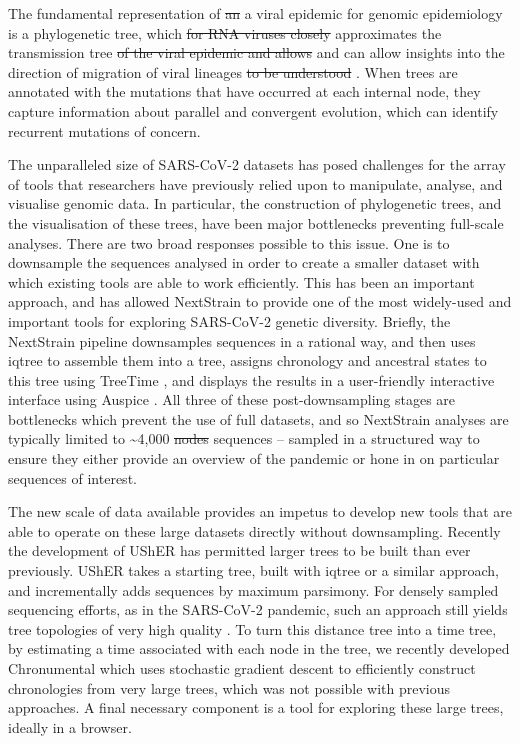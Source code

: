 \documentclass[twocolumn]{bioRxiv}
\providecommand{\DIFadd}[1]{{\protect\color{teal}#1}}
\providecommand{\DIFdel}[1]{{\protect\color{red}\sout{#1}}}
\providecommand{\DIFaddbegin}{}
\providecommand{\DIFaddend}{}
\providecommand{\DIFdelbegin}{}
\providecommand{\DIFdelend}{}
\begin{document}
The fundamental representation of \DIFdelbegin \DIFdel{an }\DIFdelend \DIFaddbegin \DIFadd{a viral }\DIFaddend epidemic for genomic epidemiology is a phylogenetic tree, which \DIFdelbegin \DIFdel{for RNA viruses closely }\DIFdelend approximates the transmission tree \DIFdelbegin \DIFdel{of the viral epidemic and allows }\DIFdelend \DIFaddbegin \DIFadd{and can allow insights into }\DIFaddend the direction of migration of viral lineages \DIFdelbegin \DIFdel{to be understood }\DIFdelend \citep{pmid27501264}. When trees are annotated with the mutations that have occurred at each internal node, they capture information about parallel and convergent evolution, which can identify recurrent mutations of concern.

The unparalleled size of SARS-CoV-2 datasets has posed challenges for the array of tools that researchers have previously relied upon to manipulate, analyse, and visualise genomic data. In particular, the construction of phylogenetic trees, and the visualisation of these trees, have been major bottlenecks preventing full-scale analyses. There are two broad responses possible to this issue. One is to downsample the sequences analysed in order to create a smaller dataset with which existing tools are able to work efficiently. This has been an important approach, and has allowed NextStrain \citep{nextstrain} to provide one of the most widely-used and important tools for exploring SARS-CoV-2 genetic diversity. Briefly, the NextStrain pipeline downsamples sequences in a rational way, and then uses iqtree \citep{iqtree} to assemble them into a tree, assigns chronology and ancestral states to this tree using TreeTime \citep{treetime}, and displays the results in a user-friendly interactive interface using Auspice \citep{nextstrain}. All three of these post-downsampling stages are bottlenecks which prevent the use of full datasets, and so NextStrain analyses are typically limited to \textasciitilde4,000 \DIFdelbegin \DIFdel{nodes }\DIFdelend \DIFaddbegin \DIFadd{sequences }\DIFaddend -- sampled in a structured way to ensure they either provide an overview of the pandemic or hone in on particular sequences of interest.


The new scale of data available provides an impetus to develop new tools that are able to operate on these large datasets directly without downsampling. Recently the development of UShER \citep{usher} has permitted larger trees to be built than ever previously. UShER takes a starting tree, built with iqtree or a similar approach, and incrementally adds sequences by maximum parsimony. For densely sampled sequencing efforts, as in the SARS-CoV-2 pandemic, such an approach still yields tree topologies of very high quality \citep{Thornlow2021.12.02.471004}. To turn this distance tree into a time tree, by estimating a time associated with each node in the tree, we recently developed Chronumental \citep{chronumental} which uses stochastic gradient descent to efficiently construct chronologies from very large trees, which was not possible with previous approaches. A final necessary component is a tool for exploring these large trees, ideally in a browser.
\end{document}
